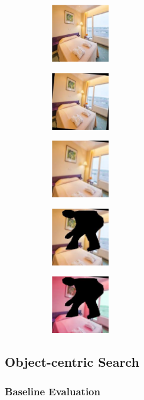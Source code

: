 \documentclass[letterpaper]{article} %
\begin{document}
\begin{figure}
\centering
   \begin{subfigure}[b]{1.2in}
        \centering
        \includegraphics[height=1in]{figures/data_augmentation/1.png}
        \caption{}
    \end{subfigure}
   \begin{subfigure}[b]{1.2in}
        \centering
        \includegraphics[height=1in]{figures/data_augmentation/2.png}
        \caption{}
    \end{subfigure}
    \begin{subfigure}[b]{1.2in}
        \centering
        \includegraphics[height=1in]{figures/data_augmentation/3.png}
        \caption{}
    \end{subfigure}
    \begin{subfigure}[b]{1.2in}
        \centering
        \includegraphics[height=1in]{figures/data_augmentation/4.png}
        \caption{}
    \end{subfigure}
    \begin{subfigure}[b]{1.2in}
        \centering
        \includegraphics[height=1in]{figures/data_augmentation/5.png}
        \caption{}
    \end{subfigure}
    \caption[]{}
    \label{fig:data_augmentation}
\end{figure}



\subsection{Object-centric Search}
\subsubsection{Baseline Evaluation}



\end{document}
